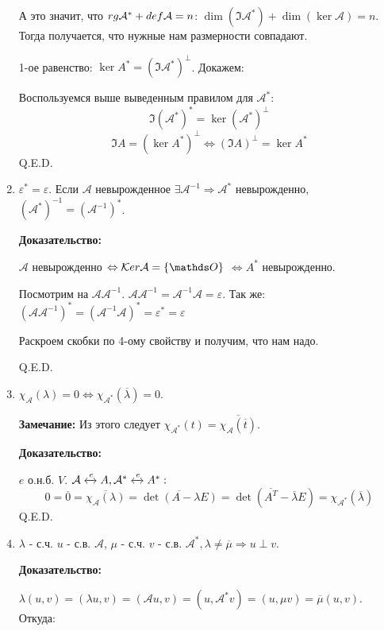 \begin{enumerate}
А это значит, что $rg \mathcal{A}^* + def \mathcal{A} = n$: $\dim (\Im \mathcal{A}^*) + \dim (\ker \mathcal{A}) = n$.
Тогда получается, что нужные нам размерности совпадают.

1-ое равенство: $\ker A^* = (\Im \mathcal{A}^*)^\perp$. Докажем:

Воспользуемся выше выведенным правилом для $\mathcal{A}^*$:
$$\Im(\mathcal{A}^*)^* = \ker (\mathcal{A}^*)^\perp$$
$$\Im A  =  (\ker A^*) ^\perp \Leftrightarrow (\Im A)^\perp = \ker A^*$$
\hfill Q.E.D.

\item $\varepsilon^* = \varepsilon$. Если $\mathcal{A}$ невырожденное $\exists \mathcal{A}^{-1} \Rightarrow \mathcal{A}^*$ невырожденно, $(\mathcal{A}^*)^{-1} = (\mathcal{A}^{-1})^*$.

\textbf{Доказательство:}

$\mathcal{A}$ невырожденно $\Leftrightarrow \ker \mathcal{A} = \{\zero\}$ $\Leftrightarrow A^*$ невырожденно.

Посмотрим на $\mathcal{A}\mathcal{A}^{-1}$. $\mathcal{A}\mathcal{A}^{-1}= \mathcal{A}^{-1}\mathcal{A} = \varepsilon$. Так же:
$(\mathcal{A}\mathcal{A}^{-1})^*= (\mathcal{A}^{-1}\mathcal{A})^* = \varepsilon^* = \varepsilon$

Раскроем скобки по 4-ому свойству и получим, что нам надо.

\hfill Q.E.D.

\item $\chi_\mathcal{A}(\lambda) = 0  \Leftrightarrow \chi_{\mathcal{A}^*}(\overline{\lambda})=0$. 

\textbf{Замечание:}  Из этого следует $\chi_{\mathcal{A}^*}(t)=\overline{\chi_\mathcal{A}(\overline{t})}$.

\textbf{Доказательство:}

$e$ о.н.б. $V$. $\mathcal{A} \xleftrightarrow{e}A, \mathcal{A}^* \xleftrightarrow{e}A^*:$
$$0 = \overline{ 0} = \overline{\chi_\mathcal{A}(\lambda)}= \overline{\det (A - \lambda E)} = \det (\overline{A^T} - \overline{\lambda} E) = \chi_{\mathcal{A}^*} (\overline{\lambda})$$
\hfill Q.E.D.

\item $\lambda$ - с.ч. $u$ - с.в. $\mathcal{A}$, $\mu$ - с.ч. $v$ - с.в. $\mathcal{A^*}, \lambda \neq \overline{\mu} \Rightarrow u \perp v$.

\textbf{Доказательство:}

$\lambda(u,v)=(\lambda u,v)=(\mathcal{A}u, v ) = (u,\mathcal{A}^* v) = (u, \mu v) = \overline{\mu}(u,v)$. Откуда:


\end{enumerate}
